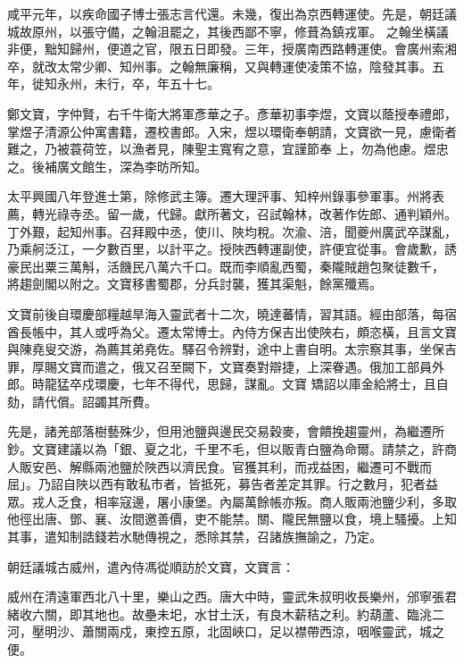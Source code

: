 \begin{pinyinscope}
 咸平元年，以疾命國子博士張志言代還。未幾，復出為京西轉運使。先是，朝廷議城故原州，以張守備，之翰沮罷之，其後西鄙不寧，修葺為鎮戎軍。
 之翰坐橫議非便，黜知歸州，便道之官，限五日即發。三年，授廣南西路轉運使。會廣州索湘卒，就改太常少卿、知州事。之翰無廉稱，又與轉運使凌策不協，陰發其事。五年，徙知永州，未行，卒，年五十七。



 鄭文寶，字仲賢，右千牛衛大將軍彥華之子。彥華初事李煜，文寶以蔭授奉禮郎，掌煜子清源公仲寓書籍，遷校書郎。入宋，煜以環衛奉朝請，文寶欲一見，慮衛者難之，乃被蓑荷笠，以漁者見，陳聖主寬宥之意，宜謹節奉
 上，勿為他慮。煜忠之。後補廣文館生，深為李昉所知。



 太平興國八年登進士第，除修武主簿。遷大理評事、知梓州錄事參軍事。州將表薦，轉光祿寺丞。留一歲，代歸。獻所著文，召試翰林，改著作佐郎、通判穎州。丁外艱，起知州事。召拜殿中丞，使川、陜均稅。次渝、涪，聞夔州廣武卒謀亂，乃乘舸泛江，一夕數百里，以計平之。授陜西轉運副使，許便宜從事。會歲歉，誘豪民出粟三萬斛，活饑民八萬六千口。既而李順亂西蜀，秦隴賊趙包聚徒數千，
 將趨劍閣以附之。文寶移書蜀郡，分兵討襲，獲其渠魁，餘黨殲焉。



 文寶前後自環慶部糧越旱海入靈武者十二次，曉達蕃情，習其語。經由部落，每宿酋長帳中，其人或呼為父。遷太常博士。內侍方保吉出使陜右，頗恣橫，且言文寶與陳堯叟交游，為薦其弟堯佐。驛召令辨對，途中上書自明。太宗察其事，坐保吉罪，厚賜文寶而遣之，俄又召至闕下，文寶奏對辯捷，上深眷遇。俄加工部員外郎。時龍猛卒戍環慶，七年不得代，思歸，謀亂。文寶
 矯詔以庫金給將士，且自劾，請代償。詔蠲其所費。



 先是，諸羌部落樹藝殊少，但用池鹽與邊民交易穀麥，會饋挽趨靈州，為繼遷所鈔。文寶建議以為「銀、夏之北，千里不毛，但以販青白鹽為命爾。請禁之，許商人販安邑、解縣兩池鹽於陜西以濟民食。官獲其利，而戎益困，繼遷可不戰而屈」。乃詔自陜以西有敢私市者，皆抵死，募告者差定其罪。行之數月，犯者益眾。戎人乏食，相率寇邊，屠小康堡。內屬萬餘帳亦叛。商人販兩池鹽少利，多取
 他徑出唐、鄧、襄、汝間邀善價，吏不能禁。關、隴民無鹽以食，境上騷擾。上知其事，遣知制誥錢若水馳傳視之，悉除其禁，召諸族撫諭之，乃定。



 朝廷議城古威州，遣內侍馮從順訪於文寶，文寶言：



 威州在清遠軍西北八十里，樂山之西。唐大中時，靈武朱叔明收長樂州，邠寧張君緒收六關，即其地也。故壘未圯，水甘土沃，有良木薪秸之利。約葫蘆、臨洮二河，壓明沙、蕭關兩戍，東控五原，北固峽口，足以襟帶西涼，咽喉靈武，城之便。




\end{pinyinscope}
